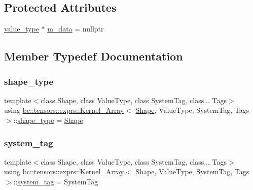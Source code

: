 \subsection*{Protected Attributes}
\begin{DoxyCompactItemize}
\item 
\hyperlink{structbc_1_1tensors_1_1exprs_1_1Kernel__Array_ae8195ebc960dd40b6c731a269c00e37b}{value\+\_\+type} $\ast$ \hyperlink{structbc_1_1tensors_1_1exprs_1_1Kernel__Array_a945c43b3cb6c54f6b982c84ea93cfae5}{m\+\_\+data} = nullptr
\end{DoxyCompactItemize}


\subsection{Member Typedef Documentation}
\mbox{\label{structbc_1_1tensors_1_1exprs_1_1Kernel__Array_ae6a4db456a47818cda06bb76d05a3b6e}} 
\subsubsection{\texorpdfstring{shape\+\_\+type}{shape\_type}}
{\footnotesize\ttfamily template$<$class Shape, class Value\+Type, class System\+Tag, class... Tags$>$ \\
using \hyperlink{structbc_1_1tensors_1_1exprs_1_1Kernel__Array}{bc\+::tensors\+::exprs\+::\+Kernel\+\_\+\+Array}$<$ \hyperlink{structbc_1_1Shape}{Shape}, Value\+Type, System\+Tag, Tags $>$\+::\hyperlink{structbc_1_1tensors_1_1exprs_1_1Kernel__Array_ae6a4db456a47818cda06bb76d05a3b6e}{shape\+\_\+type} =  \hyperlink{structbc_1_1Shape}{Shape}}

\mbox{\label{structbc_1_1tensors_1_1exprs_1_1Kernel__Array_a3e7ac04624aaeb892ed9f2cf2f51c051}} 
\subsubsection{\texorpdfstring{system\+\_\+tag}{system\_tag}}
{\footnotesize\ttfamily template$<$class Shape, class Value\+Type, class System\+Tag, class... Tags$>$ \\
using \hyperlink{structbc_1_1tensors_1_1exprs_1_1Kernel__Array}{bc\+::tensors\+::exprs\+::\+Kernel\+\_\+\+Array}$<$ \hyperlink{structbc_1_1Shape}{Shape}, Value\+Type, System\+Tag, Tags $>$\+::\hyperlink{structbc_1_1tensors_1_1exprs_1_1Kernel__Array_a3e7ac04624aaeb892ed9f2cf2f51c051}{system\+\_\+tag} =  System\+Tag}

